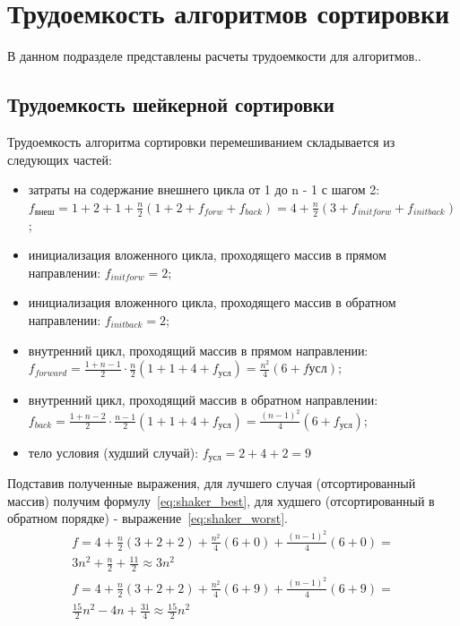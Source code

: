 \documentclass[12pt]{report}
\begin{document}
    \section{Трудоемкость алгоритмов сортировки}
    В данном подразделе представлены расчеты трудоемкости для алгоритмов..

    \subsection{Трудоемкость шейкерной сортировки}
    Трудоемкость алгоритма сортировки перемешиванием складывается из следующих частей:
    \begin{itemize}
        \item затраты на содержание внешнего цикла от 1 до n - 1 с шагом 2:
        $f_{\text{внеш}}=1 + 2 + 1 + \frac{n}{2}(1 + 2 + f_{forw} + f_{back})
        = 4 + \frac{n}{2}(3 + f_{init forw} + f_{init back})$;
        \item инициализация вложенного цикла, проходящего массив в прямом направлении: $f_{init forw}=2$;
        \item инициализация вложенного цикла, проходящего массив в обратном направлении: $f_{init back}=2$;
        \item внутренний цикл, проходящий массив в прямом направлении:
        $f_{forward}= \frac{1 + n - 1}{2} \cdot \frac{n}{2}(1 + 1 + 4 + f_{\text{усл}}) =
        \frac{n^2}{4} (6 + f{\text{усл}})$;
        \item внутренний цикл, проходящий массив в обратном направлении:
        $f_{back}= \frac{1 + n - 2}{2} \cdot \frac{n-1}{2}(1 + 1 + 4 + f_{\text{усл}}) =
        \frac{(n-1)^2}{4} (6 + f_{\text{усл}})$;
        \item тело условия (худший случай): $f_{\text{усл}} = 2 + 4 + 2 = 9$
    \end{itemize}

    Подставив полученные выражения, для лучшего случая (отсортированный массив) получим формулу~\ref{eq:shaker_best},
    для худшего (отсортированный в обратном порядке) - выражение~\ref{eq:shaker_worst}.
    \begin{equation}
        \label{eq:shaker_best}
        \begin{array}{ll}
            f = 4 + \frac{n}{2}(3 + 2 + 2) + \frac{n^2}{4} (6 + 0) + \frac{(n-1)^2}{4} (6 + 0) =\\
            3n^2 + \frac{n}{2} + \frac{11}{2} \approx 3n^2
        \end{array}
    \end{equation}
    \begin{equation}
        \label{eq:shaker_worst}
        \begin{array}{ll}
            f = 4 + \frac{n}{2}(3 + 2 + 2) + \frac{n^2}{4} (6 + 9) + \frac{(n-1)^2}{4} (6 + 9) =\\
            \frac{15}{2}n^2 - 4n + \frac{31}{4} \approx \frac{15}{2}n^2
        \end{array}
    \end{equation}
\end{document}
